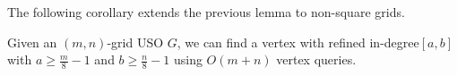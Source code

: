 \documentclass[runningheads,a4paper]{llncs}
\newcommand{\indegree}{refined in-degree\xspace}
\begin{document}
The following corollary extends the previous lemma to non-square grids.

\begin{corollary}\label{corollary: n/4 indegree}
  Given an $(m,n)$-grid USO $G$, we can find a vertex with \indegree $[a,b]$ with $a \geq \frac{m}{8} - 1$ and  $b \geq \frac{n}{8} - 1$ using $O(m+n)$ vertex queries.
\end{corollary} 


\end{document}
